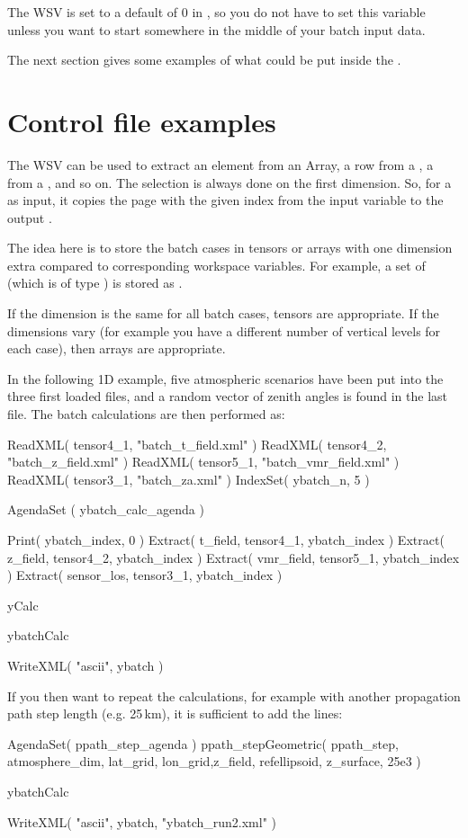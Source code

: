 The WSV  is set to a default of 0 in
, so you do not have to set this variable
unless you want to start somewhere in the middle of your batch input
data. 

The next section gives some examples of what could be put inside
the .

\section{Control file examples}
%
The WSV  can be used to extract an element from an
Array, a row from a , a
 from a , and so on. The
selection is always done on the first dimension. So, for a
 as input, it copies the page with the given index
from the input  variable to the output
.

The idea here is to store the batch cases in tensors or arrays with
one dimension extra compared to corresponding workspace variables. For
example, a set of  (which is of type
) is stored as .

If the dimension is the same for all batch cases, tensors are
appropriate. If the dimensions vary (for example you have a different
number of vertical levels for each case), then arrays are appropriate.

In the following 1D example, five atmospheric scenarios
have been put into the three first loaded files, and a random vector
of zenith angles is found in the last file. The batch calculations
are then performed as:

\begin{code}
ReadXML( tensor4_1, "batch_t_field.xml" )
ReadXML( tensor4_2, "batch_z_field.xml" )
ReadXML( tensor5_1, "batch_vmr_field.xml" )
ReadXML( tensor3_1, "batch_za.xml" )
IndexSet( ybatch_n, 5 )

AgendaSet ( ybatch_calc_agenda ){
  Print( ybatch_index, 0 )
  Extract( t_field,    tensor4_1, ybatch_index )
  Extract( z_field,    tensor4_2, ybatch_index )
  Extract( vmr_field,  tensor5_1, ybatch_index )
  Extract( sensor_los, tensor3_1, ybatch_index )

  yCalc
}

ybatchCalc

WriteXML( "ascii", ybatch )
\end{code}

If you then want to repeat the calculations, for example with another
propagation path step length (e.g. 25\,km), it is sufficient to add
the lines:

\begin{code}
AgendaSet( ppath_step_agenda ){
   ppath_stepGeometric( ppath_step, atmosphere_dim, lat_grid,
                        lon_grid,z_field, refellipsoid, z_surface,
                        25e3 )
}

ybatchCalc

WriteXML( "ascii", ybatch, "ybatch_run2.xml" )
\end{code}


